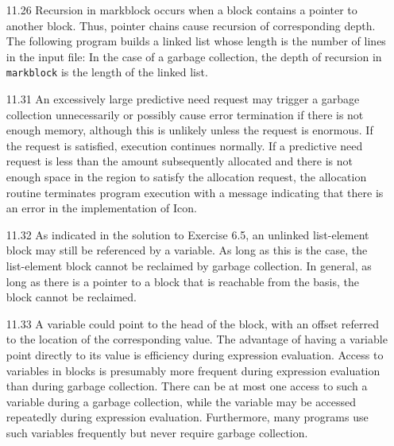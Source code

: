 \begin{itemize}
\goodbreak\item[11.26]
Recursion in markblock occurs when a block contains a pointer to another
block. Thus, pointer chains cause recursion of corresponding depth. The
following program builds a linked list whose length is the number of lines
in the input file:
In the case of a garbage collection, the depth of recursion in \texttt{markblock}
is the length of the linked list.

\goodbreak\item[11.31]
An excessively large predictive need request may trigger a garbage collection
unnecessarily or possibly cause error termination if there is not
enough memory, although this is unlikely unless the request is enormous.
If the request is satisfied, execution continues normally. If a predictive
need request is less than the amount subsequently allocated and there is
not enough space in the region to satisfy the allocation request, the allocation
routine terminates program execution with a message indicating that
there is an error in the implementation of Icon.

\goodbreak\item[11.32]
As indicated in the solution to Exercise 6.5, an unlinked list-element
block may still be referenced by a variable. As long as this is the case, the
list-element block cannot be reclaimed by garbage collection. In general,
as long as there is a pointer to a block that is reachable from the basis, the
block cannot be reclaimed.

\goodbreak\item[11.33]
A variable could point to the head of the block, with an offset referred to
the location of the corresponding value. The advantage of having a variable
point directly to its value is efficiency during expression evaluation.
Access to variables in blocks is presumably more frequent during expression
evaluation than during garbage collection. There can be at most one
access to such a variable during a garbage collection, while the variable
may be accessed repeatedly during expression evaluation. Furthermore,
many programs use such variables frequently but never require garbage
collection.


\end{itemize}
